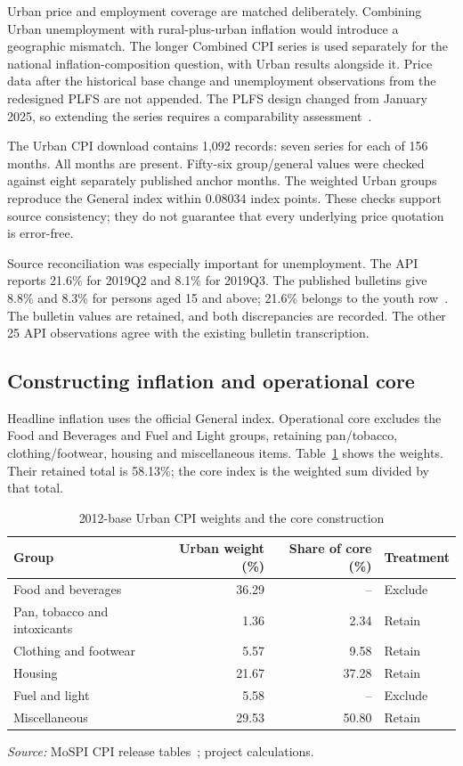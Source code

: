 \documentclass[11pt,a4paper]{article}
\newcommand{\source}[1]{{\footnotesize\emph{Source:} #1\par}}
\begin{document}
Urban price and employment coverage are matched deliberately. Combining Urban unemployment with rural-plus-urban inflation would introduce a geographic mismatch. The longer Combined CPI series is used separately for the national inflation-composition question, with Urban results alongside it. Price data after the historical base change and unemployment observations from the redesigned PLFS are not appended. The PLFS design changed from January 2025, so extending the series requires a comparability assessment~\cite{plfschange}.

The Urban CPI download contains 1,092 records: seven series for each of 156 months. All months are present. Fifty-six group/general values were checked against eight separately published anchor months. The weighted Urban groups reproduce the General index within 0.08034 index points. These checks support source consistency; they do not guarantee that every underlying price quotation is error-free.

Source reconciliation was especially important for unemployment. The API reports 21.6\% for 2019Q2 and 8.1\% for 2019Q3. The published bulletins give 8.8\% and 8.3\% for persons aged 15 and above; 21.6\% belongs to the youth row~\cite{plfs2019a,plfs2019b}. The bulletin values are retained, and both discrepancies are recorded. The other 25 API observations agree with the existing bulletin transcription.

\subsection{Constructing inflation and operational core}

Headline inflation uses the official General index. Operational core excludes the Food and Beverages and Fuel and Light groups, retaining pan/tobacco, clothing/footwear, housing and miscellaneous items. Table~\ref{tab:weights} shows the weights. Their retained total is 58.13\%; the core index is the weighted sum divided by that total.

\begin{table}[htbp]
\centering\small
\caption{2012-base Urban CPI weights and the core construction}
\label{tab:weights}
\begin{tabularx}{\linewidth}{Xrrl}
\toprule
Group & Urban weight (\%) & Share of core (\%) & Treatment\\
\midrule
Food and beverages &36.29&--&Exclude\\
Pan, tobacco and intoxicants&1.36&2.34&Retain\\
Clothing and footwear&5.57&9.58&Retain\\
Housing&21.67&37.28&Retain\\
Fuel and light&5.58&--&Exclude\\
Miscellaneous&29.53&50.80&Retain\\
\bottomrule
\end{tabularx}
\source{MoSPI CPI release tables~\cite{cpirelease}; project calculations.}
\end{table}
\end{document}
